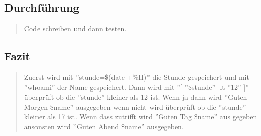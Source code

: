 	\subsection{Durchführung}
		\begin{quote}
			Code schreiben und dann testen.\\
		\end{quote}
	\subsection{Fazit}
		\begin{quote}
			
			Zuerst wird mit ''stunde=\$(date +\%H)'' die Stunde gespeichert und mit ''whoami'' der Name gespeichert. Dann wird mit ''[ ''\$stunde'' -lt ''12'' ]'' \"uberpr\"uft ob die ''stunde'' kleiner als 12 ist. Wenn ja dann wird ''Guten Morgen \$name'' ausgegeben wenn nicht wird \"uberpr\"uft ob die ''stunde'' kleiner als 17 ist. Wenn dass zutrifft wird ''Guten Tag \$name'' aus gegeben ansonsten wird ''Guten Abend \$name'' ausgegeben.\\
		\end{quote}